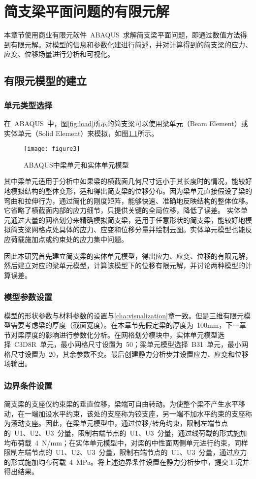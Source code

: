 \chapter{简支梁平面问题的有限元解}
\label{cha:FEAsolution}
本章节使用商业有限元软件~ABAQUS~求解简支梁平面问题，即通过数值方法得到有限元解。对模型的信息和参数化建进行简述，并对计算得到的简支梁的应力、应变、位移场量进行分析和可视化。
\section{有限元模型的建立}
\subsection{单元类型选择}
在~ABAQUS~中，图\ref{fig:load}所示的简支梁可以使用梁单元（Beam Element）或实体单元（Solid Element）来模拟，如图\ref{fig:models}所示。
\begin{figure}[htbp]
    \centering
	\texttt{[image: figure3]}
    \caption{ABAQUS中梁单元和实体单元模型}
    \label{fig:models}
\end{figure}
其中梁单元适用于分析中如果梁的横截面几何尺寸远小于其长度时的情况，能较好地模拟结构的整体变形，适和得出简支梁的位移分布。因为梁单元直接假设了梁的弯曲和拉伸行为，通过简化的刚度矩阵，能够快速、准确地反映结构的整体位移。它省略了横截面内部的应力细节，只提供关键的全局位移，降低了误差。
实体单元通过大量的网格划分来精确模拟简支梁，适用于任意形状的简支梁，能较好地模拟简支梁网格点处具体的应力、应变和位移分量并绘制云图。实体单元模型也能反应荷载施加点或约束处的应力集中问题。

因此本研究首先建立简支梁的实体单元模型，得出应力、应变、位移的有限元解，然后建立对应的梁单元模型，计算该模型下的位移有限元解，并讨论两种模型的计算误差。
\subsection{模型参数设置}
模型的形状参数与材料参数的设置与\ref{cha:visualization}章一致。但是三维有限元模型需要考虑梁的厚度（截面宽度）。在本章节先假定梁的厚度为~100mm，下一章节对梁厚度的影响进行参数化分析。在网格划分模块中，实体单元模型选择~C3D8R~单元，最小网格尺寸设置为~50；梁单元模型选择~B31~单元，最小网格尺寸设置为~20，其余参数不变。最后创建静力分析步并设置应力、应变和位移场输出。
\subsection{边界条件设置}
简支梁的支座仅约束梁的垂直位移，梁端可自由转动。为使整个梁不产生水平移动，在一端加设水平约束，该处的支座称为铰支座，另一端不加水平约束的支座称为滚动支座。因此，在梁单元模型中，通过位移/转角约束，限制左端节点的~U1、U2、U3~分量，限制右端节点的~U1、U3~分量，通过线荷载的形式施加均布荷载~4~N/mm；在实体单元模型中，对梁的中性面两侧单元进行约束，同样限制左端节点的~U1、U2、U3~分量，限制右端节点的~U1、U3~分量，通过应力的形式施加均布荷载~4~MPa。将上述边界条件设置在静力分析步中，提交工况并得出结果。
